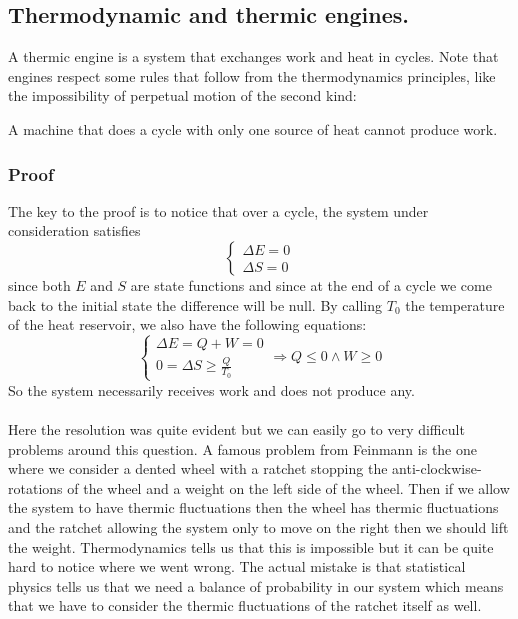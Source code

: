 \documentclass[10pt,a4paper]{book}
\begin{document}
\subsection{Thermodynamic and thermic engines.}
A thermic engine is a system that exchanges work and heat in cycles. Note that engines respect some rules that follow from the thermodynamics principles, like the impossibility of perpetual motion of the second kind:
\begin{center}
A machine that does a cycle with only one source of heat cannot produce work.
\end{center}
\subsubsection{Proof}
The key to the proof is to notice that over a cycle, the system under consideration satisfies
\[
\begin{cases}
\Delta E = 0\\
\Delta S = 0
\end{cases}
\]
since both $E$ and $S$ are state functions and since at the end of a cycle we come back to the initial state the difference will be null. By calling $T_0$ the temperature of the heat reservoir, we also have the following equations:
\[
\begin{cases}
\Delta E = Q + W = 0\\
0 = \Delta S \geq  \frac{Q}{T_0}
\end{cases} \Rightarrow Q \leq 0 \land W \geq 0
\]
So the system necessarily receives work and does not produce any. \\\\
Here the resolution was quite evident but we can easily go to very difficult problems around this question. A famous problem from Feinmann is the one where we consider a dented wheel with a ratchet stopping the anti-clockwise-rotations of the wheel and a weight on the left side of the wheel. Then if we allow the system to have thermic fluctuations then the wheel has thermic fluctuations and the ratchet allowing the system only to move on the right then we should lift the weight. Thermodynamics tells us that this is impossible but it can be quite hard to notice where we went wrong. The actual mistake is that statistical physics tells us that we need a balance of probability in our system which means that we have to consider the thermic fluctuations of the ratchet itself as well.
\end{document}
